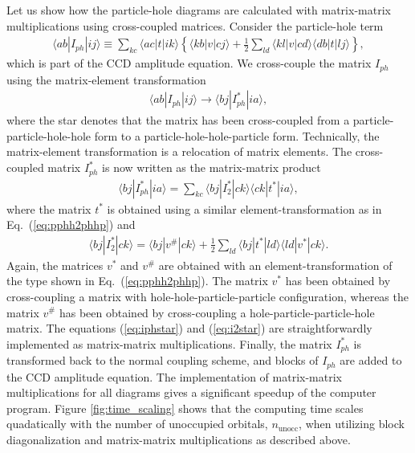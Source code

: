 \documentclass[a4paper,12pt]{report}
\begin{document}
Let us show how the particle-hole diagrams are calculated with
matrix-matrix multiplications using cross-coupled matrices.  
Consider the particle-hole term
\begin{align}
  \langle ab|I_{ph}|ij \rangle \equiv \sum_{kc}
  \langle ac|t|ik\rangle \left\{ \langle kb|v|cj\rangle
  + \frac{1}{2}\sum_{ld}\langle kl|v|cd\rangle
  \langle db|t|lj\rangle \right\} ,
\end{align}
which is part of the CCD amplitude equation. We cross-couple
the matrix $I_{ph}$ using the matrix-element transformation 
\begin{align} \label{eq:pphh2phhp}
  \langle ab|I_{ph}|ij\rangle \longrightarrow 
  \langle bj|I_{ph}^{*}|ia\rangle ,
\end{align} 
where the star denotes that the matrix has been cross-coupled
from a particle-particle-hole-hole form to a 
particle-hole-hole-particle form. Technically, the 
matrix-element transformation is a relocation of matrix 
elements. The cross-coupled matrix $I_{ph}^{*}$ is now 
written as the matrix-matrix product
\begin{align} \label{eq:iphstar}
  \langle bj|I_{ph}^{*}|ia\rangle = \sum_{kc}
  \langle bj|I_{2}^{*}|ck\rangle \langle ck|t^{*}|ia\rangle ,
\end{align} 
where the matrix $t^{*}$ is obtained using a similar 
element-transformation as in Eq.~(\ref{eq:pphh2phhp})
and 
\begin{align} \label{eq:i2star}
  \langle bj|I_{2}^{*}|ck\rangle = \langle bj|v^{\# }|ck\rangle
  + \frac{1}{2}\sum_{ld}\langle bj|t^{*}|ld\rangle
  \langle ld|v^{*}|ck\rangle .
\end{align}
Again, the matrices $v^{*}$ and $v^{\# }$ are obtained with an 
element-transformation of the type shown in 
Eq.~(\ref{eq:pphh2phhp}). The matrix $v^{*}$ has been 
obtained by cross-coupling a matrix with
hole-hole-particle-particle configuration, whereas
the matrix $v^{\# }$ has been obtained by cross-coupling 
a hole-particle-particle-hole matrix. The equations
(\ref{eq:iphstar}) and (\ref{eq:i2star}) are 
straightforwardly implemented as matrix-matrix 
multiplications. Finally, the matrix $I_{ph}^{*}$ is 
transformed back to the normal coupling scheme, and
blocks of $I_{ph}$ are added to the CCD amplitude equation.
The implementation of matrix-matrix multiplications
for all diagrams gives a significant speedup of the
computer program. Figure \ref{fig:time_scaling} shows
that the computing time scales quadatically with the
number of unoccupied orbitals, $n_{\mathrm{unocc}}$,
when utilizing block diagonalization and matrix-matrix
multiplications as described above.  
\end{document}
